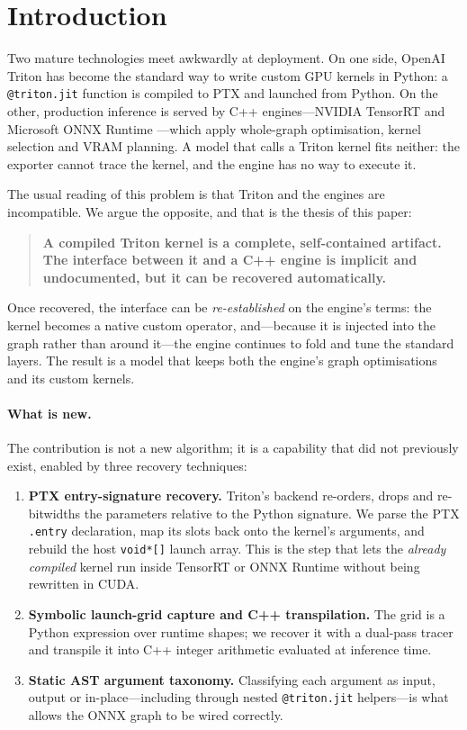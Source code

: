 \documentclass{article}
\begin{document}
\section{Introduction}

Two mature technologies meet awkwardly at deployment. On one side, OpenAI Triton
\cite{triton2019} has become the standard way to write custom GPU kernels in
Python: a \texttt{@triton.jit} function is compiled to PTX and launched from
Python. On the other, production inference is served by C++ engines---NVIDIA
TensorRT \cite{tensorrt} and Microsoft ONNX Runtime \cite{onnxruntime}---which
apply whole-graph optimisation, kernel selection and VRAM planning. A model that
calls a Triton kernel fits neither: the exporter cannot trace the kernel, and the
engine has no way to execute it.

The usual reading of this problem is that Triton and the engines are
incompatible. We argue the opposite, and that is the thesis of this paper:

\begin{quote}
\textbf{A compiled Triton kernel is a complete, self-contained artifact. The
interface between it and a C++ engine is implicit and undocumented, but it can be
recovered automatically.}
\end{quote}

Once recovered, the interface can be \emph{re-established} on the engine's terms:
the kernel becomes a native custom operator, and---because it is injected into
the graph rather than around it---the engine continues to fold and tune the
standard layers. The result is a model that keeps both the engine's graph
optimisations and its custom kernels.

\paragraph{What is new.} The contribution is not a new algorithm; it is a
capability that did not previously exist, enabled by three recovery techniques:

\begin{enumerate}[leftmargin=1.6em]
    \item \textbf{PTX entry-signature recovery.} Triton's backend re-orders,
    drops and re-bitwidths the parameters relative to the Python signature. We
    parse the PTX \texttt{.entry} declaration, map its slots back onto the
    kernel's arguments, and rebuild the host \texttt{void*[]} launch array. This
    is the step that lets the \emph{already compiled} kernel run inside TensorRT
    or ONNX Runtime without being rewritten in CUDA.
    \item \textbf{Symbolic launch-grid capture and C++ transpilation.} The grid
    is a Python expression over runtime shapes; we recover it with a dual-pass
    tracer and transpile it into C++ integer arithmetic evaluated at inference
    time.
    \item \textbf{Static AST argument taxonomy.} Classifying each argument as
    input, output or in-place---including through nested \texttt{@triton.jit}
    helpers---is what allows the ONNX graph to be wired correctly.
\end{enumerate}
\end{document}
